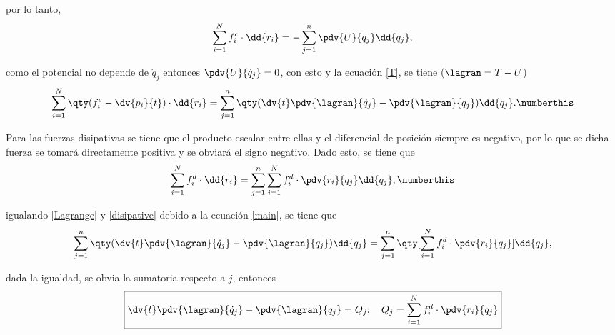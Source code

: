 por lo tanto,
	$$\sum _{i=1} ^N f_i ^c \cdot \dd{r_i} = -\sum _{j=1} ^n \pdv{U}{q_j} \dd{q_j},$$

como el potencial no depende de $\dot{q}_j$ entonces $\pdv{U}{\dot{q}_j} = 0$, con esto y la ecuación \eqref{T}, se tiene ($\lagran = T-U$)
\begin{displaymath}
	\sum_{i=1} ^N \qty(f_i ^c - \dv{p_i}{t}) \cdot \dd{r_i} = \sum _{j=1} ^n \qty(\dv{t} \pdv{\lagran}{\dot{q}_j} - \pdv{\lagran}{q_j}) \dd{q_j}. \numberthis \label{Lagrange}
\end{displaymath}

Para las fuerzas disipativas se tiene que el producto escalar entre ellas y el diferencial de posición siempre es negativo, por lo que se dicha fuerza se tomará directamente positiva y se obviará el signo negativo. Dado esto, se tiene que
\begin{displaymath}
	\sum _{i=1} ^N f_i ^d \cdot \dd{r_i} = \sum _{j=1} ^n \sum _{i=1} ^N f_i ^d \cdot \pdv{r_i}{q_j} \dd{q_j}, \numberthis \label{disipative}
\end{displaymath}

igualando \eqref{Lagrange} y \eqref{disipative} debido a la ecuación \eqref{main}, se tiene que
	$$\sum _{j=1} ^n \qty(\dv{t} \pdv{\lagran}{\dot{q}_j} - \pdv{\lagran}{q_j}) \dd{q_j} = \sum _{j=1} ^n \qty[ \sum _{i=1} ^N f_i ^d \cdot \pdv{r_i}{q_j} ] \dd{q_j},$$

dada la igualdad, se obvia la sumatoria respecto a $j$, entonces
	$$\boxed{\dv{t} \pdv{\lagran}{\dot{q}_j} - \pdv{\lagran}{q_j} = Q_j ; \quad Q_j = \sum _{i=1} ^N f_i ^d \cdot \pdv{r_i}{q_j}}$$



















